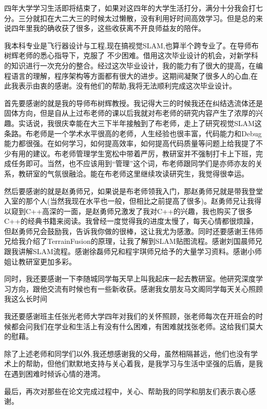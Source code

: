 
\begin{acknowledgements}
四年大学学习生活即将结束了，如果对这四年的大学生活打分，满分十分我会打七分。三分就扣在大二大三的时候太过懒散，没有利用好时间高效学习。但是总的来说四年里我的确收获了很多，这些收获离不开良师益友的陪伴。\par
我本科专业是飞行器设计与工程,现在搞视觉SLAM,也算半个跨专业了。在导师布树辉老师的悉心指导下，克服了
不少困难。借用这次毕业设计的机会，对新学科的知识进行一次充分的整合。经过这次毕业设计，我的能力有了很大的提高，在编程语言的理解，程序架构等方面都有很大的进步。这期间凝聚了很多人的心血,在此我表示由衷的感谢。没有他们的帮助,我将无法顺利完成这次毕业设计。\par
首先要感谢的就是我的导师布树辉教授。我记得大三的时候我还在纠结选流体还是固体方向，但是自从上过布老师的课以后我就对布老师的研究内容产生了浓厚的兴趣。实话说，我很庆幸能在大三下半年接触到了布老师，走上了研究视觉SLAM这条路。布老师是一个学术水平很高的老师，人生经验也很丰富，代码能力和Debug能力都很强。在如何学习，如何提高效率，如何提高代码质量等问题上给我提了不少有用的建议。布老师管理学生宽松中带着严厉，教研室并不强制打卡上下班，完成任务即可。当然，也不应该用到“管理”这个词，布老师跟同学们是亦师亦友的关系，教研室的气氛很融洽。能在布老师这里继续攻读研究生，我觉得很幸运。\par
然后要感谢的就是赵勇师兄，如果说是布老师领我入门，那赵勇师兄就是带我登堂入室的那个人(当然我现在水平也一般，但相比之前提高了很多)。赵勇师兄让我得以窥到C++高深的一面，是赵勇师兄激发了我对C++的兴趣，我也购买了很多C++的经典书籍来阅读。我曾经一度觉得我的进度太慢了，每天心情都很烦躁，但赵勇师兄会鼓励我，告诉我你做的很棒，这让我尤为感激。同时还要感谢王伟师兄给我介绍了TerrainFusion的原理，让我了解到SLAM贴图流程。感谢刘国晨师兄跟我讲解SLAM流程。感谢徐磊师兄和程宇琪师兄给予的大量学习资料。感谢小师姐让教研室更加多彩。\par
同时，我还要感谢一下李随城同学每天早上叫我起床一起去教研室。他研究深度学习方向，跟他交流有时候也有一些新收获。感谢我女朋友马文阁同学每天关心照顾我这么长时间\par
我还要感谢班主任张光老师大学四年对我们的关怀照顾，张老师每次在开班会的时候都会问我们在学业和生活上有没有什么困难，有困难就找张老师。这给我们莫大的慰藉。\par
除了上述老师和同学们以外,我还想感谢我的父母，虽然相隔甚远，他们也没有学术上的帮助，但他们默默地支持与关心着我，是我学习与生活中坚强的后盾，是我在遇到困难时倾诉心情的港湾。\par
最后，再次对那些在论文完成过程中，关心、帮助我的同学和朋友们表示衷心感谢。
\end{acknowledgements}
